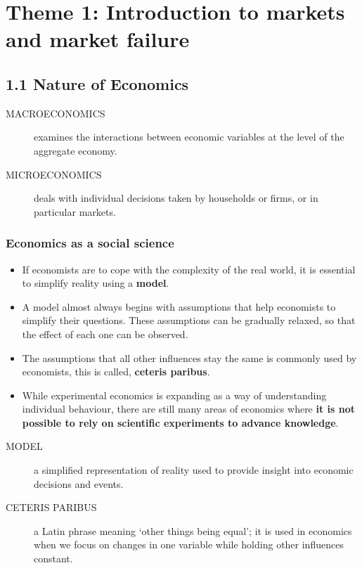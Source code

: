 \chapter{Theme 1: Introduction to markets and market failure}

\section{1.1 Nature of Economics}
\begin{description}
\item[MACROECONOMICS] examines the interactions between economic variables at the level of the aggregate economy.
\item[MICROECONOMICS] deals with individual decisions taken by households or firms, or in particular markets.
\end{description}

\subsection{Economics as a social science}

\begin{itemize}
\item If economists are to cope with the complexity of the real world, it is essential to simplify reality using a \textbf{model}.
\item A model almost always begins with assumptions that help economists to simplify their questions. These assumptions can be gradually relaxed, so that the effect of each one can be observed.
\item The assumptions that all other influences stay the same is commonly used by economists, this is called, \textbf{ceteris paribus}.
\item While experimental economics is expanding as a way of understanding individual behaviour, there are still many areas of economics where \textbf{it is not possible to rely on scientific experiments to advance knowledge}.
\end{itemize}
\begin{description}
\item[MODEL] a simplified representation of reality used to provide insight into economic decisions and events.
\item[CETERIS PARIBUS] a Latin phrase meaning ‘other things being equal’; it is used in economics when we focus on changes in one variable while holding other influences constant.
\end{description}

